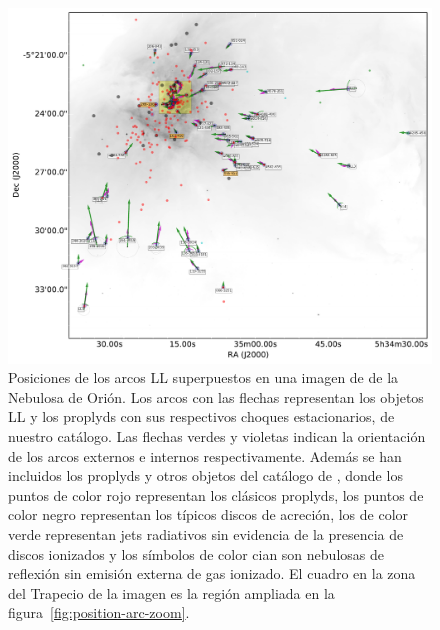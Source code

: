 \begin{figure}
  \centering
  \includegraphics[width=\linewidth]{ll-pos-image}
  \caption{Posiciones de los arcos LL superpuestos en una imagen de \ha{} de la Nebulosa de Orión. Los arcos con las flechas representan los objetos LL y los proplyds con sus respectivos choques estacionarios, de nuestro catálogo. Las flechas verdes y violetas indican la orientación de los arcos externos e internos respectivamente. Además se han incluidos los proplyds y otros objetos del catálogo de \citet{Ricci:2008}, donde los puntos de color rojo representan los clásicos proplyds, los puntos de color negro representan los típicos discos de acreción, los de color verde representan jets radiativos sin evidencia de la presencia de discos ionizados y los símbolos de color cian son nebulosas de reflexión sin emisión externa de gas ionizado. El cuadro en la zona del Trapecio de la imagen es la región ampliada en la figura~\ref{fig:position-arc-zoom}.}
  \label{fig:position-arc}
\end{figure}

